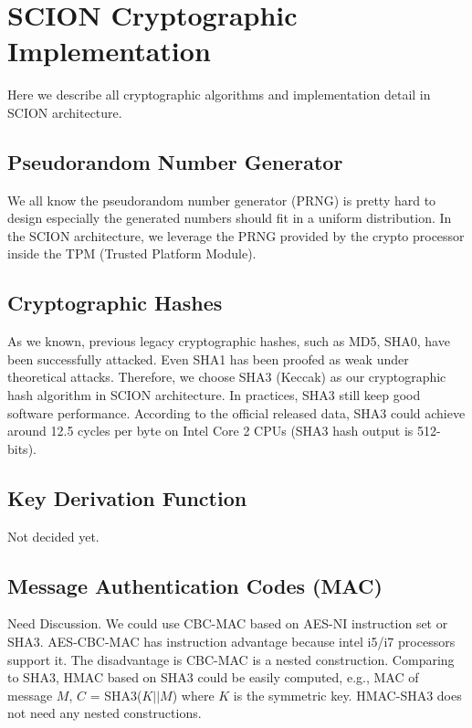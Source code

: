 
\chapter{SCION Cryptographic Implementation}


Here we describe all cryptographic algorithms and implementation detail in SCION architecture. 

\section{Pseudorandom Number Generator}
We all know the pseudorandom number generator (PRNG) is pretty hard to design especially
the generated numbers should fit in a uniform distribution.
In the SCION architecture, we leverage the PRNG provided by the crypto processor inside
the TPM (Trusted Platform Module).

\section{Cryptographic Hashes}
As we known, previous legacy cryptographic hashes, such as MD5, SHA0, have been successfully attacked. %
Even SHA1 has been proofed as weak under theoretical attacks. %
Therefore, we choose SHA3 (Keccak) as our cryptographic hash algorithm in SCION architecture.
In practices, SHA3 still keep good software performance. According to the official released data, 
SHA3 could achieve around 12.5 cycles per byte on Intel Core 2 CPUs (SHA3 hash output is 512-bits). 

\section{Key Derivation Function}
Not decided yet.

\section{Message Authentication Codes (MAC)}
Need Discussion. We could use CBC-MAC based on AES-NI instruction set or SHA3.
AES-CBC-MAC has instruction advantage because intel i5/i7 processors support it.
The disadvantage is CBC-MAC is a nested construction.
Comparing to SHA3, HMAC based on SHA3 could be easily computed,
e.g., MAC of message $M$, $C$ = SHA3($K||M$) where $K$ is the symmetric key.
HMAC-SHA3 does not need any nested constructions.

